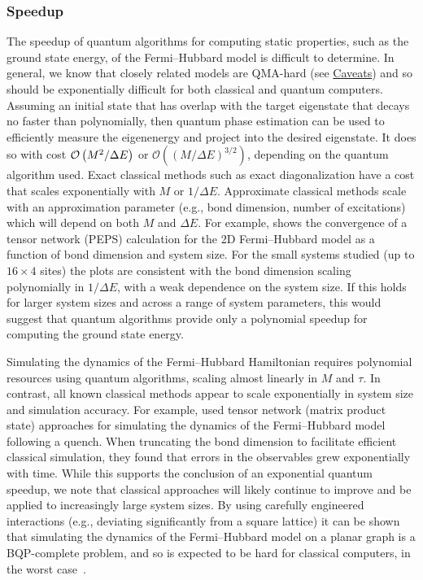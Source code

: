 \begin{refsection}
\subsubsection*{Speedup}
The speedup of quantum algorithms for computing static properties, such as the ground state energy, of the Fermi--Hubbard model is difficult to determine. In general, we know that closely related models are QMA-hard (see \hyperref[FHcaveats]{Caveats}) and so should be exponentially difficult for both classical and quantum computers. Assuming an initial state that has overlap with the target eigenstate that decays no faster than polynomially, then quantum phase estimation can be used to efficiently measure the eigenenergy and project into the desired eigenstate. It does so with cost $\mathcal{O}\left( M^2/\Delta E \right)$ or $\mathcal{O}((M/\Delta E)^{3/2})$, depending on the quantum algorithm used. Exact classical methods such as exact diagonalization have a cost that scales exponentially with $M$ or $1/\Delta E$. Approximate classical methods scale with an approximation parameter (e.g., bond dimension, number of excitations) which will depend on both $M$ and $\Delta E$. For example, \cite[Fig.~4]{lee2022isThereEvidenceChemistry} shows the convergence of a tensor network (PEPS) calculation for the 2D Fermi--Hubbard model as a function of bond dimension and system size. For the small systems studied (up to $16 \times 4$ sites) the plots are consistent with the bond dimension scaling polynomially in $1/\Delta E$, with a weak dependence on the system size. If this holds for larger system sizes and across a range of system parameters, this would suggest that quantum algorithms provide only a polynomial speedup for computing the ground state energy.

Simulating the dynamics of the Fermi--Hubbard Hamiltonian requires polynomial resources using quantum algorithms, scaling almost linearly in $M$ and $\tau$. In contrast, all known classical methods appear to scale exponentially in system size and simulation accuracy. For example, \cite{flannigan2022} used tensor network (matrix product state) approaches for simulating the dynamics of the Fermi--Hubbard model following a quench. When truncating the bond dimension to facilitate efficient classical simulation, they found that errors in the observables grew exponentially with time. While this supports the conclusion of an exponential quantum speedup, we note that classical approaches will likely continue to improve and be applied to increasingly large system sizes. By using carefully engineered interactions (e.g., deviating significantly from a square lattice) it can be shown that simulating the dynamics of the Fermi--Hubbard model on a planar graph is a BQP-complete problem, and so is expected to be hard for classical computers, in the worst case~\cite{bao2015universal}.





\end{refsection}
